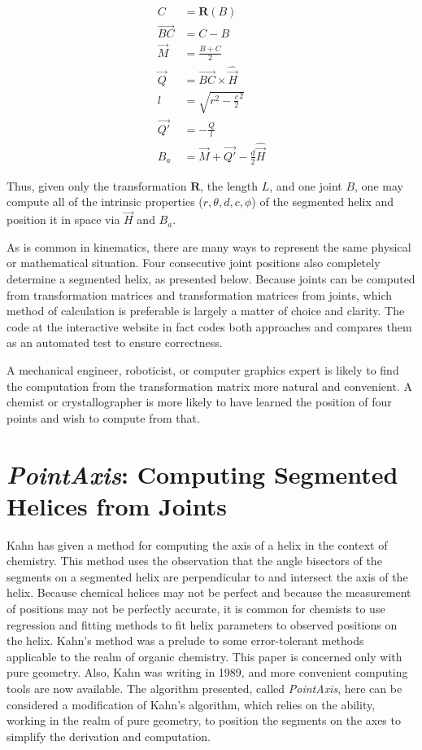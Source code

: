 \documentclass[11pt]{article}
\begin{document}
{\begin{align}
  C &= \bm{R}(B) \\
  \overrightarrow{BC} &= C - B\\
  \overrightarrow{M} &= \frac{B + C}{2} \\
  \overrightarrow{Q} &= \overrightarrow{BC} \times \hat{\overrightarrow{H}} \\
  l &= \sqrt{r^2 - \frac{c}{2}^2} \\
  \overrightarrow{Q'} &= -\frac{Q}{l} \\
  B_a &= \overrightarrow{M} + \overrightarrow{Q'} - \frac{d}{2}\hat{\overrightarrow{H}}
\end{align}

Thus, given only the transformation $\bm{R}$, the length $L$, and one
joint $B$, one may compute all of the intrinsic properties
($r,\theta,d,c,\phi$) of
the segmented helix and position it in space via $\overrightarrow{H}$ and $B_a$.

As is common in kinematics\cite{funda1990computational}, there are many ways to represent
the same physical or mathematical situation.
Four consecutive joint positions also completely determine a segmented helix, as presented below.
Because joints can be computed from transformation
matrices and transformation matrices from joints,
which method of calculation is preferable is largely
a matter of choice and clarity.
The code at the interactive website
in fact codes both approaches and compares them as an automated test to ensure
correctness.

A mechanical engineer, roboticist, or computer graphics expert is
likely to find the computation from the
transformation matrix more natural and convenient.
A chemist or crystallographer is more likely to
have learned the position of four points and wish to compute from that.

\section{{\em PointAxis}: Computing Segmented Helices from Joints}
\label{sec:pointaxis}

Kahn\cite{kahn1989defining} has given a method for computing
the axis of a helix in the context of chemistry.
This method uses the observation that the angle bisectors
of the segments on a segmented helix are perpendicular to
and intersect the axis of the helix.
Because chemical helices may not be perfect and because the measurement of positions may not be perfectly accurate,
it is common for chemists to use regression and fitting methods to fit helix parameters to observed positions
on the helix.
Kahn's method was a prelude to some error-tolerant methods applicable to
the realm of organic chemistry.
This paper is concerned only with pure geometry. Also, Kahn was writing in 1989,
and more convenient computing tools are now available.
The algorithm presented, called {\em PointAxis}, here can be considered a modification of Kahn's algorithm,
which relies on the ability, working in the realm of pure geometry, to position the segments on the axes
to simplify the derivation and computation.

}
\end{document}
